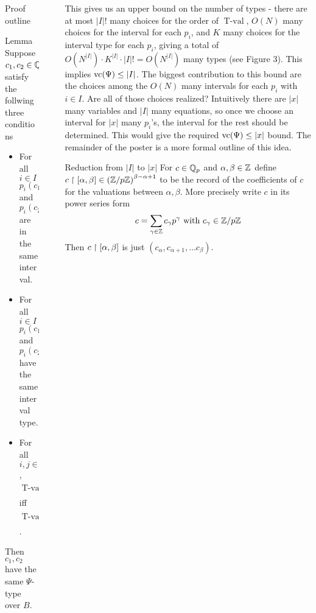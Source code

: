 \documentclass[final]{beamer}
\newcommand{\paren}[1]{\left( #1 \right)}
\DeclareMathOperator{\tval}{T-val}
\newlength{\sepwid}
\newlength{\onecolwid}
\begin{document}
\begin{frame}[t]
\begin{columns}[t]
\begin{column}{\onecolwid}
\begin{block}{Proof outline}
        \begin{alertblock}{Lemma}
                Suppose $c_1, c_2 \in \mathbb{Q}_p^{|x|}$ satisfy the follwing three conditions 
                \begin{itemize}
                    \item For all $i \in I$ $p_i(c_1)$ and $p_i(c_2)$ are in the same interval.
                    \item For all $i \in I$ $p_i(c_1)$ and $p_i(c_2)$ have the same interval type.
                    \item For all $i,j \in I$, $\tval(p_i(c_1)) > \tval(p_j(c_1))$ iff $\tval(p_i(c_2)) > \tval(p_j(c_2))$.
                \end{itemize}
                Then $c_1, c_2$ have the same $\Psi$-type over $B$.
        \end{alertblock}
    \end{block}    
\end{column} %

\begin{column}{\sepwid}\end{column} %

\begin{column}{\onecolwid}

    This gives us an upper bound on the number of types - there are at most $|I|!$ many choices for the order of $\tval$,
    $O(N)$ many choices for the interval for each $p_i$,
    and $K$ many choices for the interval type for each $p_i$,
    giving a total of $O(N^{|I|}) \cdot K^{|I|} \cdot |I|! = O(N^{|I|})$ many types (see {\color{blue}Figure 3}).
    This implies $\operatorname{vc}(\Psi) \leq |I|$.
    The biggest contribution to this bound are the choices among the $O(N)$ many intervals for each $p_i$ with $i \in I$.
    Are all of those choices realized?
    Intuitively there are $|x|$ many variables and $|I|$ many equations,
    so once we choose an interval for $|x|$ many $p_i$'s, the interval for the rest should be determined.
    This would give the required $\operatorname{vc}(\Psi) \leq |x|$ bound.
    The remainder of the poster is a more formal outline of this idea.

    \begin{block}{Reduction from $|I|$ to $|x|$}
        For $c \in \mathbb{Q}_p$ and $\alpha, \beta \in \mathbb{Z}$ define $c \midr [\alpha, \beta] \in \paren{\Z/p\Z}^{\beta - \alpha + 1}$
        to be the record of the coefficients of $c$ for the valuations between $\alpha, \beta$.
	More precisely write $c$ in its power series form
	\begin{align*}
		c = \sum_{\gamma \in \mathbb{Z}} c_\gamma p^\gamma \text{ with } c_\gamma \in \mathbb{Z}/p\mathbb{Z}
	\end{align*}
	Then $c \upharpoonright [\alpha, \beta]$ is just $(c_\alpha, c_{\alpha+1}, \ldots c_\beta)$.
        

\end{block}
\end{column}
\end{columns}
\end{frame}
\end{document}
